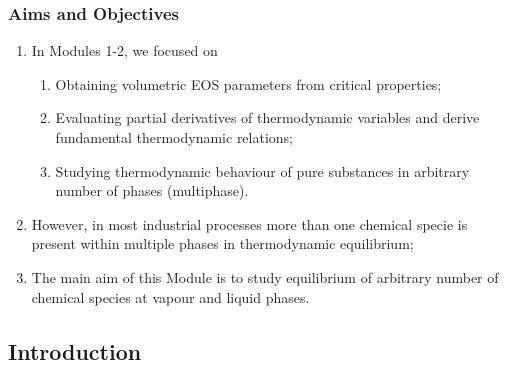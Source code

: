 \documentclass[10pt,compress,handout,ignorenonframetext,unknownkeysallowed]{beamer}
\begin{document}
\begin{frame}
 \frametitle{Aims and Objectives}
   \begin{enumerate}
     \item<1-> In Modules 1-2, we focused on 
       \begin{enumerate}
         \item<1-> Obtaining volumetric EOS parameters from critical properties;
         \item<1-> Evaluating partial derivatives of thermodynamic variables and derive fundamental thermodynamic relations;
         \item<1-> Studying thermodynamic behaviour of pure substances in arbitrary number of phases (multiphase).
       \end{enumerate} 
     \item<2-> However, in most industrial processes more than one chemical specie is present within multiple phases in thermodynamic equilibrium;
     \item<3-> The main aim of this Module is to study equilibrium of arbitrary number of chemical species at vapour and liquid phases.
   \end{enumerate}
\end{frame}




\subsection{Introduction} 
\end{document}
